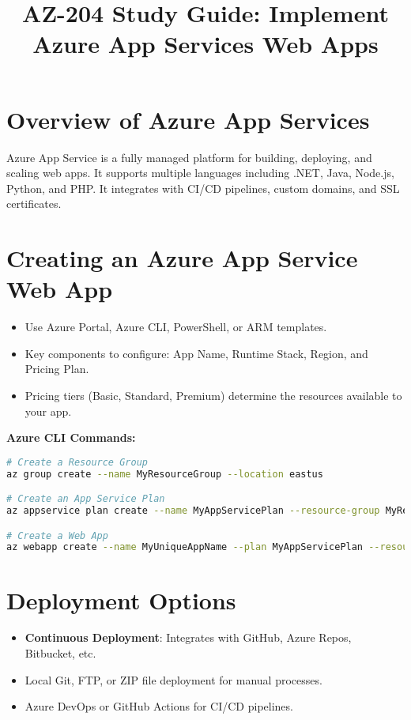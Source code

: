 \documentclass{article}
\title{AZ-204 Study Guide: Implement Azure App Services Web Apps}
\author{}
\date{}
\begin{document}
\maketitle

\section{Overview of Azure App Services}
Azure App Service is a fully managed platform for building, deploying, and scaling web apps. It supports multiple languages including .NET, Java, Node.js, Python, and PHP. It integrates with CI/CD pipelines, custom domains, and SSL certificates.

\section{Creating an Azure App Service Web App}
\begin{itemize}
    \item Use Azure Portal, Azure CLI, PowerShell, or ARM templates.
    \item Key components to configure: App Name, Runtime Stack, Region, and Pricing Plan.
    \item Pricing tiers (Basic, Standard, Premium) determine the resources available to your app.
\end{itemize}

\textbf{Azure CLI Commands:}
\begin{lstlisting}[language=bash]
# Create a Resource Group
az group create --name MyResourceGroup --location eastus

# Create an App Service Plan
az appservice plan create --name MyAppServicePlan --resource-group MyResourceGroup --sku B1

# Create a Web App
az webapp create --name MyUniqueAppName --plan MyAppServicePlan --resource-group MyResourceGroup
\end{lstlisting}

\section{Deployment Options}
\begin{itemize}
    \item \textbf{Continuous Deployment}: Integrates with GitHub, Azure Repos, Bitbucket, etc.
    \item Local Git, FTP, or ZIP file deployment for manual processes.
    \item Azure DevOps or GitHub Actions for CI/CD pipelines.
\end{itemize}
\end{document}
